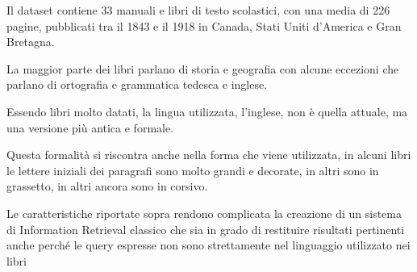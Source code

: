 Il dataset contiene 33 manuali e libri di testo scolastici, con una media di 226 pagine, pubblicati tra il 1843 e il 1918 in Canada, Stati Uniti d'America e Gran Bretagna.

La maggior parte dei libri parlano di storia e geografia con alcune eccezioni che parlano di ortografia e grammatica tedesca e inglese.

Essendo libri molto datati, la lingua utilizzata, l'inglese, non è quella attuale, ma una versione più antica e formale.

Questa formalità si riscontra anche nella forma che viene utilizzata, in alcuni libri le lettere iniziali dei paragrafi sono molto grandi e decorate, in altri sono in grassetto, in altri ancora sono in corsivo.

Le caratteristiche riportate sopra rendono complicata la creazione di un sistema di Information Retrieval classico che 
sia in grado di restituire risultati pertinenti anche perché le query espresse non sono strettamente nel linguaggio utilizzato nei libri  